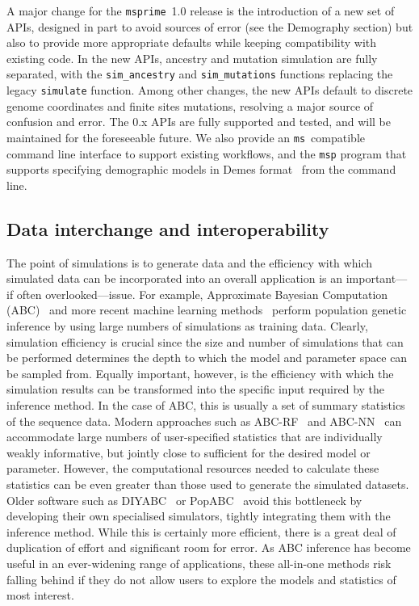 \documentclass{article}
\newcommand{\msprime}[0]{\texttt{msprime}}
\newcommand{\ms}[0]{\texttt{ms}}
\begin{document}
A major change for the \msprime\ 1.0 release is the introduction of a new set of APIs,
designed in part to avoid sources of error (see the Demography section) but
also to provide more appropriate defaults while keeping compatibility with
existing code. In the new APIs, ancestry and mutation simulation are fully
separated, with the \texttt{sim\_ancestry} and \texttt{sim\_mutations}
functions replacing the legacy \texttt{simulate} function. Among other changes,
the new APIs default to discrete genome coordinates and finite sites mutations,
resolving a major source of confusion and error. The 0.x APIs are fully
supported and tested, and will be maintained for the foreseeable future.
We also provide an \ms\ compatible
command line interface to support existing workflows, and the
\texttt{msp} program that supports specifying demographic models in
Demes format~\citep{gower2021demes} from the command line.


\subsection*{Data interchange and interoperability}
The point of simulations is to generate data and the efficiency with
which simulated data can be incorporated into an overall application
is an important---if often overlooked---issue.
For example, Approximate Bayesian Computation
(ABC)~\citep{beaumont2002approximate,csillery2010approximate,wegmann2010abctoolbox}
and more recent machine learning
methods~\citep{sheehan2016deep,schrider2018supervised,flagel2019unreasonable}
perform population genetic inference by using large numbers of
simulations as training data. Clearly, simulation efficiency is
crucial since the size and number of simulations that can be performed determines
the depth to which the model and parameter space can be sampled from.
Equally important,
however, is the efficiency with which the simulation results can be
transformed into the specific input required by the inference method.
In the case of ABC, this is usually a set of summary statistics of the sequence data.
Modern approaches such as
ABC-RF~\citep{raynal2019abc,pudlo2016abc} and
ABC-NN~\citep{csillery2012abc,blum2010abc} can accommodate large numbers of user-specified statistics that are individually weakly informative,
but jointly close to sufficient for the desired model or parameter.
However, the computational resources needed to calculate these statistics can be even
greater than those used to generate the simulated datasets.
Older software such as DIYABC~\citep{cornuet2008inferring}
or PopABC~\citep{lopes2009popabc} avoid this bottleneck by
developing their own specialised simulators, tightly integrating them
with the inference method. While this is certainly more efficient,
there is a great deal of duplication of effort and significant
room for error.
As ABC inference has become useful in an ever-widening range of applications,
these all-in-one methods risk falling behind if they do not allow users to explore
the models and statistics of most interest.
\end{document}

